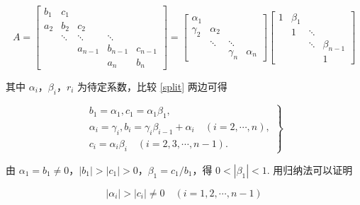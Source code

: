 \begin{equation}
    A =
    \begin{bmatrix}
        b_1 & c_1                                  \\
        a_2 & b_2    & c_2                         \\
            & \ddots & \ddots  & \ddots            \\
            &        & a_{n-1} & b_{n-1} & c_{n-1} \\
            &        &         & a_n     & b_n
    \end{bmatrix}
    =
    \begin{bmatrix}
        \alpha_1                                  \\
        \gamma_2 & \alpha_2                       \\
                 & \ddots   & \ddots              \\
                 &          & \gamma_n & \alpha_n
    \end{bmatrix}
    \begin{bmatrix}
        1 & \beta_1                        \\
          & 1       & \ddots               \\
          &         & \ddots & \beta_{n-1} \\
          &         &        & 1
    \end{bmatrix}
    \label{split}
\end{equation}

其中 $\alpha_i$，$\beta_i$，$r_i$ 为待定系数，比较 \eqref{split} 两边可得

\begin{equation}
    \left.\begin{matrix}
        b_1 = \alpha_1, c_1 = \alpha_1\beta_1,                                            \\
        \alpha_i = \gamma_i, b_i = \gamma_i\beta_{i-1} + \alpha_i\quad(i = 2, \cdots, n), \\
        c_i = \alpha_i\beta_i\quad(i=2,3,\cdots,n-1).
    \end{matrix}\right\}
    \label{result}
\end{equation}

由 $\alpha_1 = b_1 \neq 0$，$\left|b_1\right| > \left|c_1\right| > 0$，$\beta_1 = c_1 / b_1$，得 $0 < \left|\beta_1\right| < 1$. 用归纳法可以证明

\[ \left|\alpha_i\right| > \left|c_i\right| \neq 0\quad(i=1,2, \cdots, n - 1)\]


